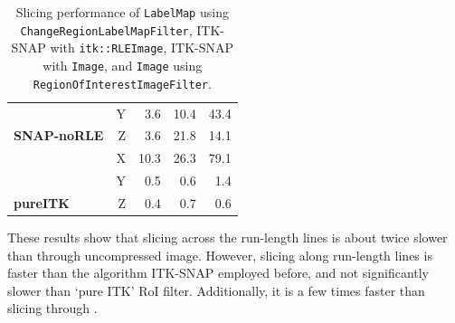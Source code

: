 \documentclass{InsightArticle}
\begin{document}
\begin{table}[h]
\begin{tabular}{lrrrr}
		{\color[HTML]{9A0000} }                                      & {\color[HTML]{9A0000} Y} & {\color[HTML]{9A0000} 3.6}  & {\color[HTML]{9A0000} 10.4} & {\color[HTML]{9A0000} 43.4}  \\
		\multirow{-3}{*}{{\color[HTML]{9A0000} \textbf{SNAP-noRLE}}} & {\color[HTML]{9A0000} Z} & {\color[HTML]{9A0000} 3.6}  & {\color[HTML]{9A0000} 21.8} & {\color[HTML]{9A0000} 14.1}  \\
																																& X                        & 10.3                        & 26.3                        & 79.1                         \\
																																& Y                        & 0.5                         & 0.6                         & 1.4                          \\
		\multirow{-3}{*}{\textbf{pureITK}}                           & Z                        & 0.4                         & 0.7                         & 0.6                         
		\end{tabular}
	\caption{Slicing performance of \texttt{LabelMap} using \texttt{ChangeRegionLabelMapFilter},
	ITK-SNAP with \texttt{itk::RLEImage}, ITK-SNAP with \texttt{Image},
	and \texttt{Image} using \texttt{RegionOfInterestImageFilter}.}
	\label{tab:slicingPerformance}
\end{table}

These results show that slicing across the run-length lines is about
twice slower than through uncompressed image.
However, slicing along run-length lines is faster than the algorithm
ITK-SNAP employed before, and not significantly slower than  `pure ITK' RoI filter.
Additionally, it is a few times faster than slicing through .




\end{document}
